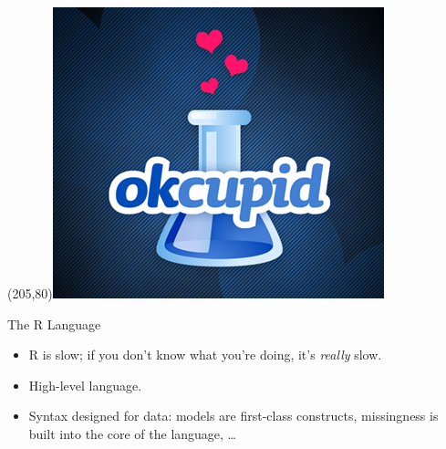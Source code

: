 \begin{frame}
\Put(205,80){\includegraphics[scale=.15]{../common/pics/R_using_logos/okcupid}}
\end{frame}






\begin{frame}
\begin{block}{The R Language}\pause
\begin{itemize}
  \item R is slow; if you don't know what you're doing, it's \emph{really} slow.
  \item High-level language.
  \item Syntax designed for data: models are first-class constructs, 
missingness is built into the core of the language, \dots
\end{itemize}
\end{block}
\end{frame}



